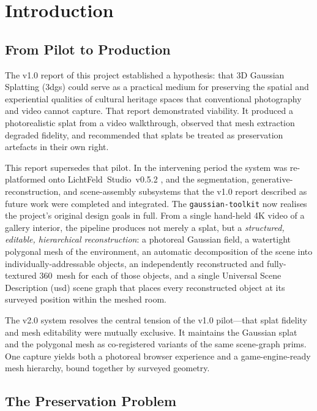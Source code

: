\chapter{Introduction}
\label{ch:intro}

\section{From Pilot to Production}
\label{sec:intro-pilot}

The v1.0 report of this project established a hypothesis: that 3D Gaussian Splatting (\acrshort{3dgs}) could serve as a practical medium for preserving the spatial and experiential qualities of cultural heritage spaces that conventional photography and video cannot capture. That report demonstrated viability. It produced a photorealistic splat from a video walkthrough, observed that mesh extraction degraded fidelity, and recommended that splats be treated as preservation artefacts in their own right.

This report supersedes that pilot. In the intervening period the system was re-platformed onto LichtFeld~Studio~v0.5.2 \parencite{LichtFeldStudio2026}, and the segmentation, generative-reconstruction, and scene-assembly subsystems that the v1.0 report described as future work were completed and integrated. The \texttt{gaussian-toolkit} now realises the project's original design goals in full. From a single hand-held 4K video of a gallery interior, the pipeline produces not merely a splat, but a \emph{structured, editable, hierarchical reconstruction}: a photoreal Gaussian field, a watertight polygonal mesh of the environment, an automatic decomposition of the scene into individually-addressable objects, an independently reconstructed and fully-textured 360\textdegree\ mesh for each of those objects, and a single Universal Scene Description (\acrshort{usd}) scene graph that places every reconstructed object at its surveyed position within the meshed room.

\begin{keyfinding}
The v2.0 system resolves the central tension of the v1.0 pilot---that splat fidelity and mesh editability were mutually exclusive. It maintains the Gaussian splat and the polygonal mesh as co-registered variants of the same scene-graph prims. One capture yields both a photoreal browser experience and a game-engine-ready mesh hierarchy, bound together by surveyed geometry.
\end{keyfinding}

\section{The Preservation Problem}
\label{sec:intro-problem}


